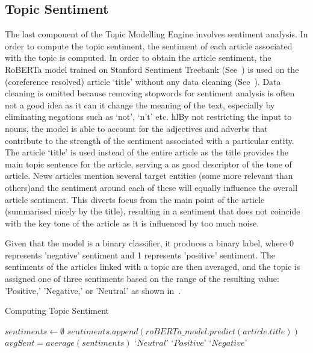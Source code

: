 \vspace{-2em}
\subsection{Topic Sentiment}

The last component of the Topic Modelling Engine involves sentiment analysis. In order to compute the topic sentiment, the sentiment of each article associated with the topic is computed. In order to obtain the article sentiment, the RoBERTa model trained on Stanford Sentiment Treebank (See~) is used on the (coreference resolved) article `title' without any data cleaning (See~). Data cleaning is omitted because removing stopwords for sentiment analysis is often not a good idea as it can it change the meaning of the text, especially by eliminating negations such as `not', `n't' etc. hl{By not restricting the input to nouns, the model is able to account for the adjectives and adverbs that contribute to the strength of the sentiment associated with a particular entity.} The article `title' is used instead of the entire article as the title provides the main topic sentence for the article, serving a as good descriptor of the tone of article. News articles mention several target entities (some more relevant than others)and the sentiment around each of these will equally influence the overall article sentiment. This diverts focus from the main point of the article (summarised nicely by the title), resulting in a sentiment that does not coincide with the key tone of the article as it is influenced by too much noise.

Given that the model is a binary classifier, it produces a binary label, where 0 represents 'negative' sentiment and 1 represents 'positive' sentiment. The sentiments of the articles linked with a topic are then averaged, and the topic is assigned one of three sentiments based on the range of the resulting value: 'Positive,' 'Negative,' or 'Neutral' as shown in~.

\begin{algorithm}[H]
  \caption{Computing Topic Sentiment}
  \label{alg:topic_sent}
  \begin{algorithmic}   
    \State $sentiments \gets  \emptyset$
    \State $\mathit{sentiments.append(roBERTa\_model.predict(article.title))}$ 
    \EndFor
    \State $avgSent = average(sentiments)$
    \State \Return `$Neutral$'
      \Return `$Positive$'
    \Else  \State \Return `$Negative$'\EndIf
  \EndFunction
\end{algorithmic}
\end{algorithm}
\vspace*{-3ex}


